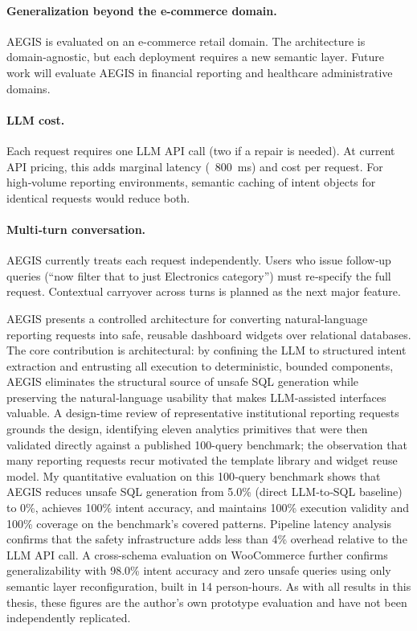 \documentclass[11pt]{article}
\begin{document}
\paragraph{Generalization beyond the e-commerce domain.} AEGIS is evaluated on an e-commerce retail domain. The architecture is domain‑agnostic, but each deployment requires a new semantic layer. Future work will evaluate AEGIS in financial reporting and healthcare administrative domains.

\paragraph{LLM cost.} Each request requires one LLM API call (two if a repair is needed). At current API pricing, this adds marginal latency (~800 ms) and cost per request. For high‑volume reporting environments, semantic caching of intent objects for identical requests would reduce both.

\paragraph{Multi‑turn conversation.} AEGIS currently treats each request independently. Users who issue follow‑up queries (``now filter that to just Electronics category'') must re‑specify the full request. Contextual carryover across turns is planned as the next major feature.

AEGIS presents a controlled architecture for converting natural‑language reporting requests into safe, reusable dashboard widgets over relational databases. The core contribution is architectural: by confining the LLM to structured intent extraction and entrusting all execution to deterministic, bounded components, AEGIS eliminates the structural source of unsafe SQL generation while preserving the natural‑language usability that makes LLM‑assisted interfaces valuable. A design-time review of representative institutional reporting requests grounds the design, identifying eleven analytics primitives that were then validated directly against a published 100-query benchmark; the observation that many reporting requests recur motivated the template library and widget reuse model. My quantitative evaluation on this 100‑query benchmark shows that AEGIS reduces unsafe SQL generation from 5.0\% (direct LLM‑to‑SQL baseline) to 0\%, achieves 100\% intent accuracy, and maintains 100\% execution validity and 100\% coverage on the benchmark's covered patterns. Pipeline latency analysis confirms that the safety infrastructure adds less than 4\% overhead relative to the LLM API call. A cross-schema evaluation on WooCommerce further confirms generalizability with 98.0\% intent accuracy and zero unsafe queries using only semantic layer reconfiguration, built in 14 person-hours. As with all results in this thesis, these figures are the author's own prototype evaluation and have not been independently replicated.
\end{document}
